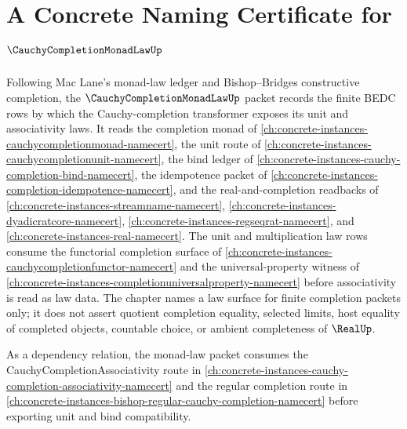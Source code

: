\chapter{A Concrete Naming Certificate for $\CauchyCompletionMonadLawUp$}
\label{ch:concrete-instances-cauchy-completion-monad-law-namecert}

Following Mac Lane's monad-law ledger and Bishop--Bridges constructive completion, the $\CauchyCompletionMonadLawUp$ packet records the finite BEDC rows by which the Cauchy-completion transformer exposes its unit and associativity laws. It reads the completion monad of \autoref{ch:concrete-instances-cauchycompletionmonad-namecert}, the unit route of \autoref{ch:concrete-instances-cauchycompletionunit-namecert}, the bind ledger of \autoref{ch:concrete-instances-cauchy-completion-bind-namecert}, the idempotence packet of \autoref{ch:concrete-instances-completion-idempotence-namecert}, and the real-and-completion readbacks of \autoref{ch:concrete-instances-streamname-namecert}, \autoref{ch:concrete-instances-dyadicratcore-namecert}, \autoref{ch:concrete-instances-regseqrat-namecert}, and \autoref{ch:concrete-instances-real-namecert}. The unit and multiplication law rows consume the functorial completion surface of \autoref{ch:concrete-instances-cauchycompletionfunctor-namecert} and the universal-property witness of \autoref{ch:concrete-instances-completionuniversalproperty-namecert} before associativity is read as law data. The chapter names a law surface for finite completion packets only; it does not assert quotient completion equality, selected limits, host equality of completed objects, countable choice, or ambient completeness of $\RealUp$.

As a dependency relation, the monad-law packet consumes the CauchyCompletionAssociativity route in \autoref{ch:concrete-instances-cauchy-completion-associativity-namecert} and the regular completion route in \autoref{ch:concrete-instances-bishop-regular-cauchy-completion-namecert} before exporting unit and bind compatibility.


